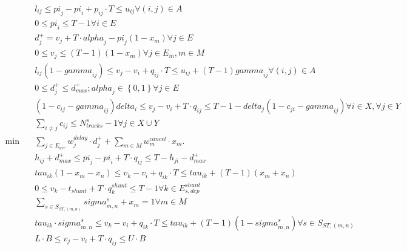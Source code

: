 \begin{align}
  & l_{i j} \leq \mathit{pi}_{j} - \mathit{pi}_{i} + p_{i j} \cdot T \leq u_{i j} \forall \left(i , j\right) \in A \tag{eq\_0001} \\
  & 0 \leq \mathit{pi}_{i} \leq T - 1 \forall i \in E \tag{eq\_0002} \\
  & d_{j}^{+} = v_{j} + T \cdot \mathit{alpha}_{j} - \mathit{pi}_{j} \left(1 - x_{m}\right) \forall j \in E \tag{eq\_0004} \\
  & 0 \leq v_{j} \leq \left(T - 1\right) \left(1 - x_{m}\right) \forall j \in E_{m} , m \in M \tag{eq\_0005} \\
  & l_{i j} \left(1 - \mathit{gamma}_{i j}\right) \leq v_{j} - v_{i} + q_{i j} \cdot T \leq u_{i j} + \left(T - 1\right) \mathit{gamma}_{i j} \forall \left(i , j\right) \in A \tag{eq\_0006} \\
  & 0 \leq d_{j}^{+} \leq d_{m a x}^{+} ; \mathit{alpha}_{j} \in \left\{0,1\right\} \forall j \in E \tag{eq\_0007} \\
  & \left(1 - c_{i j} - \mathit{gamma}_{i j}\right) \mathit{delta}_{i} \leq v_{j} - v_{i} + T \cdot q_{i j} \leq T - 1 - \mathit{delta}_{j} \left(1 - c_{j i} - \mathit{gamma}_{i j}\right) \forall i \in X , \forall j \in Y \tag{eq\_0010} \\
  & \sum_{i \neq j} c_{i j} \leq N_{t r a c k s}^{s} - 1 \forall j \in X \cup Y \tag{eq\_0011} \\
  \min\quad & \sum_{j \in E_{a r r}} w_{j}^{d e l a y} \cdot d_{j}^{+} + \sum_{m \in M} w_{m}^{c a n c e l} \cdot x_{m} . \tag{eq\_0012} \\
  & h_{i j} + d_{m a x}^{+} \leq \mathit{pi}_{j} - \mathit{pi}_{i} + T \cdot q_{i j} \leq T - h_{j i} - d_{m a x}^{+} \tag{eq\_0016} \\
  & \mathit{tau}_{i k} \left(1 - x_{m} - x_{n}\right) \leq v_{k} - v_{i} + q_{i k} \cdot T \leq \mathit{tau}_{i k} + \left(T - 1\right) \left(x_{m} + x_{n}\right) \tag{eq\_0017} \\
  & 0 \leq v_{k} - t_{s h u n t} + T \cdot q_{k}^{s h u n t} \leq T - 1 \forall k \in E_{s , d e p}^{s h u n t} \tag{eq\_0018} \\
  & \sum_{s \in S_{S T , \left(m , n\right)}} \mathit{sigma}_{m , n}^{s} + x_{m} = 1 \forall m \in M \tag{eq\_0019} \\
  & \mathit{tau}_{i k} \cdot \mathit{sigma}_{m , n}^{s} \leq v_{k} - v_{i} + q_{i k} \cdot T \leq \mathit{tau}_{i k} + \left(T - 1\right) \left(1 - \mathit{sigma}_{m , n}^{s}\right) \forall s \in S_{S T , \left(m , n\right)} \tag{eq\_0020} \\
  & L \cdot B \leq v_{j} - v_{i} + T \cdot q_{i j} \leq U \cdot B \tag{eq\_0021} \\
\end{align}
